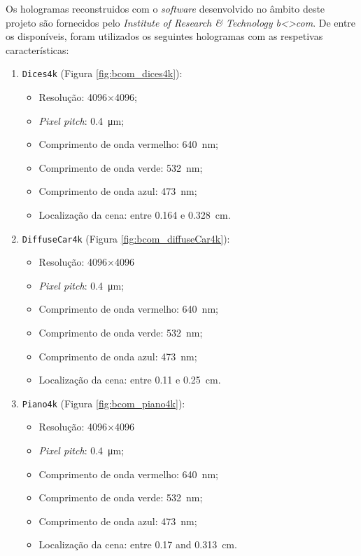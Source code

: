 Os hologramas reconstruidos com o \textit{software} desenvolvido no âmbito deste projeto são fornecidos pelo \textit{Institute of Research \& Technology b<>com}. De entre os disponíveis, foram utilizados os seguintes hologramas com as respetivas características:
\begin{enumerate}
    \item \texttt{Dices4k} (Figura \ref{fig:bcom_dices4k}):
          \begin{itemize}
              \item Resolução: 4096$\times$4096;
              \item \textit{Pixel pitch}: \SI{0.4}{\micro\meter};
              \item Comprimento de onda vermelho: \SI{640}{\nano\meter};
              \item Comprimento de onda verde: \SI{532}{\nano\meter};
              \item Comprimento de onda azul: \SI{473}{\nano\meter};
              \item Localização da cena: entre \SI{0.164}{} e \SI{0.328}{\centi\meter}.
          \end{itemize}
    \item \texttt{DiffuseCar4k} (Figura \ref{fig:bcom_diffuseCar4k}):
          \begin{itemize}
              \item Resolução: 4096$\times$4096
              \item \textit{Pixel pitch}: \SI{0.4}{\micro\meter};
              \item Comprimento de onda vermelho: \SI{640}{\nano\meter};
              \item Comprimento de onda verde: \SI{532}{\nano\meter};
              \item Comprimento de onda azul: \SI{473}{\nano\meter};
              \item Localização da cena: entre \SI{0.11}{} e \SI{0.25}{\centi\meter}.
          \end{itemize}
    \item \texttt{Piano4k} (Figura \ref{fig:bcom_piano4k}):
          \begin{itemize}
              \item Resolução: 4096$\times$4096
              \item \textit{Pixel pitch}: \SI{0.4}{\micro\meter};
              \item Comprimento de onda vermelho: \SI{640}{\nano\meter};
              \item Comprimento de onda verde: \SI{532}{\nano\meter};
              \item Comprimento de onda azul: \SI{473}{\nano\meter};
              \item Localização da cena: entre \SI{0.17}{} and \SI{0.313}{\centi\meter}.
          \end{itemize}
\end{enumerate}

